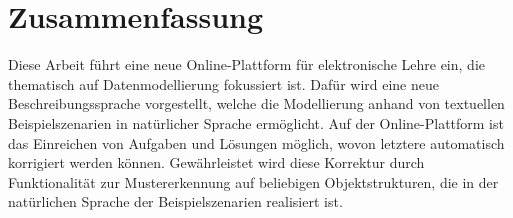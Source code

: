 \chapter*{Zusammenfassung}


Diese Arbeit führt eine neue Online-Plattform für elektronische Lehre ein, die thematisch auf Datenmodellierung fokussiert ist.
Dafür wird eine neue Beschreibungssprache vorgestellt, welche die Modellierung anhand von textuellen Beispielszenarien in natürlicher Sprache ermöglicht.
Auf der Online-Plattform ist das Einreichen von Aufgaben und Lösungen möglich, wovon letztere automatisch korrigiert werden können.
Gewährleistet wird diese Korrektur durch Funktionalität zur Mustererkennung auf beliebigen Objektstrukturen, die in der natürlichen Sprache der Beispielszenarien realisiert ist.
